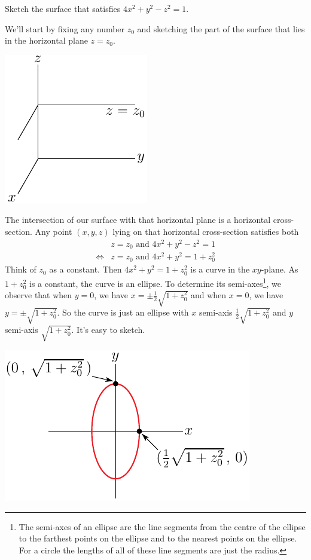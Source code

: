 \bigskip
\begin{eg}[$4x^2+y^2-z^2=1$]\label{eg hyperboloid}
\medskip
Sketch the surface that satisfies $4x^2+y^2-z^2=1$.

\soln We'll start by fixing any number $z_0$ and sketching the part of
the surface that lies in the horizontal plane $z=z_0$. 
\begin{efig}
\begin{center}
   \includegraphics{zedzeroPlane.pdf}
\end{center}
\end{efig}
The intersection of our surface with that horizontal plane is a horizontal
cross-section. Any point $(x,y,z)$ lying on that horizontal cross-section
satisfies both 
\begin{align*}
&z=z_0\text{\ \ and\ \ }4x^2+y^2-z^2=1 \\
\iff
&z=z_0\text{\  \ and\ \ }4x^2+y^2=1+z_0^2
\end{align*}
Think of $z_0$ as a constant.
Then $4x^2+y^2=1+z_0^2$ is a curve in the $xy$-plane. As $1+z_0^2$ is a constant, the curve is an ellipse. To determine its semi-axes\footnote{The
semi-axes of an ellipse are the line segments from the centre of the ellipse
to the farthest points on the ellipse and to the nearest points on the ellipse.
For a circle the lengths of all of these line segments are just the  radius.}, we observe that
when $y=0$, we have $x=\pm\frac{1}{2}\sqrt{1+z_0^2}$ and when $x=0$,
we have $y=\pm\sqrt{1+z_0^2}$. So the curve is just an ellipse with 
$x$ semi-axis $\frac{1}{2}\sqrt{1+z_0^2}$ and $y$ semi-axis 
$\sqrt{1+z_0^2}$. It's easy to sketch.
\begin{efig}
\begin{center}
   \includegraphics{ellipse.pdf}

\end{center}
\end{efig}
\end{eg}
